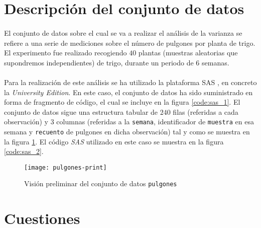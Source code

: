 \documentclass[11pt]{article}
\begin{document}
  \maketitle



  \section{Descripción del conjunto de datos}
  \label{sec:description}

    \paragraph{}
    El conjunto de datos sobre el cual se va a realizar el análisis de la varianza se refiere a una serie de mediciones sobre el número de pulgones por planta de trigo. El experimento fue realizado recogiendo $40$ plantas (muestras aleatorias que supondremos independientes) de trigo, durante un periodo de $6$ semanas.

    \paragraph{}
    Para la realización de este análisis se ha utilizado la plataforma SAS \cite{sas}, en concreto la \emph{University Edition}. En este caso, el conjunto de datos ha sido suministrado en forma de fragmento de código, el cual se incluye en la figura \ref{code:sas_1}. El conjunto de datos sigue una estructura tabular de $240$ filas (referidas a cada observación) y $3$ columnas (referidas a la \texttt{semana}, identificador de \texttt{muestra} en esa semana y \texttt{recuento} de pulgones en dicha observación) tal y como se muestra en la figura \ref{img:pulgones-print}. El código \emph{SAS} utilizado en este caso se muestra en la figura \ref{code:sas_2}.

    \begin{figure}[h]
      \centering
      \texttt{[image: pulgones-print]}
      \caption{Visión preliminar del conjunto de datos \texttt{pulgones}}
      \label{img:pulgones-print}
    \end{figure}

  \section{Cuestiones}
  \label{sec:questions}
\end{document}
